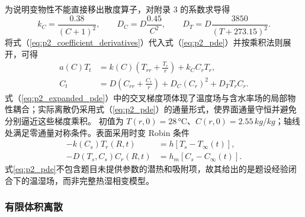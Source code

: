 \documentclass[withoutpreface,bwprint]{cumcmthesis}
\begin{document}
为说明变物性不能直接移出散度算子，对附录 3 的系数求导得
\begin{equation}
k_C=\frac{0.38}{(C+1)^2},\qquad
D_C=D\frac{0.45}{C^2},\qquad
D_T=D\frac{3850}{(T+273.15)^2}.
\label{eq:p2_coefficient_derivatives}
\end{equation}
将式（\ref{eq:p2_coefficient_derivatives}）代入式（\ref{eq:p2_pde}）并按乘积法则展开，可得
\begin{equation}
\begin{aligned}
a(C)T_t&=k(C)\left(T_{rr}+\frac{T_r}{r}\right)+k_CC_rT_r,\\
C_t&=D\left(C_{rr}+\frac{C_r}{r}\right)+D_C(C_r)^2+D_TT_rC_r.
\end{aligned}
\label{eq:p2_expanded_pde}
\end{equation}
式（\ref{eq:p2_expanded_pde}）中的交叉梯度项体现了温度场与含水率场的局部物性耦合；实际离散仍采用式（\ref{eq:p2_pde}）的通量形式，使界面通量守恒并避免分别逼近这些梯度乘积。
初值为 $T(r,0)=28\,\si{\celsius}$、$C(r,0)=2.55\,\si{kg/kg}$；轴线处满足零通量对称条件。表面采用时变 Robin 条件
\begin{equation}
\begin{aligned}
-k(C_s)T_r(R,t)&=h[T_s-T_\infty(t)],\\
-D(T_s,C_s)C_r(R,t)&=h_m[C_s-C_\infty(t)].
\end{aligned}
\label{eq:p2_robin}
\end{equation}
式\eqref{eq:p2_pde}不包含题目未提供参数的潜热和吸附项，故其给出的是题设经验闭合下的温湿场，而非完整热湿相变模型。

\subsubsection{有限体积离散}
\end{document}
